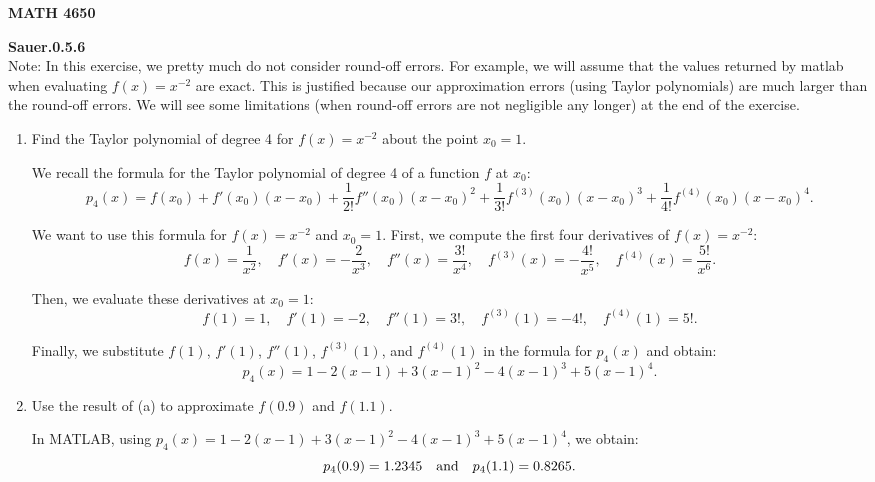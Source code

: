 \documentclass[pdftex,11pt]{article}
\begin{document}
\thispagestyle{empty}
\pagestyle{empty}

\textbf{MATH 4650} 

\vspace{2cm}

\textbf{\color{blue} Sauer.0.5.6}\\

{\color{blue} Note: In this exercise, we pretty much do not consider round-off
errors.  For example, we will assume that the values returned by matlab when
evaluating $f(x)=x^{-2}$ are exact.  This is justified because our
approximation errors (using Taylor polynomials) are much larger than the
round-off errors. We will see some limitations (when round-off errors are not
negligible any longer) at the end of the exercise.  } 

\renewcommand{\theenumi}{\alph{enumi}}
\begin{enumerate}\addtolength{\itemsep}{1.00\baselineskip}

\color{red}\item
Find the Taylor polynomial of degree 4 for $f(x)=x^{-2}$ about the point $x_0=1$.\\
\color{black}

We recall the formula for the Taylor polynomial of degree 4 of a function $f$ at $x_0$:
$$p_4(x) = 
f(x_0) 
+ f'(x_0) (x-x_0)
+ \frac{1}{2!} f''(x_0) (x-x_0)^2
+ \frac{1}{3!} f^{(3)}(x_0) (x-x_0)^3
+ \frac{1}{4!} f^{(4)}(x_0) (x-x_0)^4.
$$

We want to use this formula for $f(x)=x^{-2}$ and $x_0=1$.
First, we compute the first four derivatives of $f(x)=x^{-2}$:
$$
f(x) = \frac{1}{x^2},\quad 
f'(x) = -\frac{2}{x^3},\quad 
f''(x) = \frac{3!}{x^4},\quad 
f^{(3)}(x) = -\frac{4!}{x^5},\quad 
f^{(4)}(x) = \frac{5!}{x^6}.
$$

Then, we evaluate these derivatives at $x_0=1$:
$$
f(1) = 1,\quad 
f'(1) = -2,\quad 
f''(1) = 3!,\quad 
f^{(3)}(1) = -4!,\quad 
f^{(4)}(1) = 5!.
$$

Finally, we substitute $f(1)$, $f'(1)$, $f''(1)$, $f^{(3)}(1)$, and
$f^{(4)}(1)$ in the formula for $p_4(x)$ and obtain:
$$
p_4(x) = 
1 - 2 (x-1) + 3 (x-1)^2 - 4 (x-1)^3 + 5 (x-1)^4.
$$

\color{red}\item
Use the result of (a) to approximate $f(0.9)$ and $f(1.1)$.\\
\color{black}

In MATLAB, using $p_4(x)= 1 - 2 (x-1) + 3 (x-1)^2 - 4 (x-1)^3 + 5 (x-1)^4$, 
we obtain:
$$p_4(0.9) = 1.2345 \quad \textmd{and} \quad p_4(1.1) = 0.8265.$$


\end{enumerate}
\end{document}
